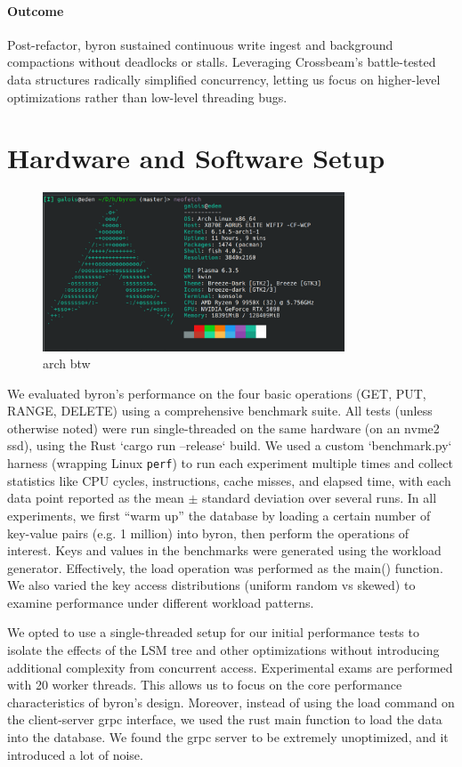 \documentclass[10pt]{article}
\begin{document}
\paragraph{Outcome}  
Post-refactor, byron sustained continuous write ingest and background compactions without deadlocks or stalls. Leveraging Crossbeam’s battle-tested data structures radically simplified concurrency, letting us focus on higher-level optimizations rather than low-level threading bugs.  


\section{Hardware and Software Setup}
\begin{figure}[htbp]
  \centering
  \includegraphics[width=0.8\textwidth]{neofetch.png}
  \caption{arch btw}
  \label{fig:neofetch}
\end{figure}

We evaluated byron’s performance on the four basic operations (GET, PUT, RANGE, DELETE) using a comprehensive benchmark suite. All tests (unless otherwise noted) were run single-threaded on the same hardware (on an nvme2 ssd), using the Rust `cargo run --release` build. We used a custom `benchmark.py` harness (wrapping Linux \texttt{perf}) to run each experiment multiple times and collect statistics like CPU cycles, instructions, cache misses, and elapsed time, with each data point reported as the mean $\pm$ standard deviation over several runs. In all experiments, we first “warm up” the database by loading a certain number of key-value pairs (e.g. 1 million) into byron, then perform the operations of interest. Keys and values in the benchmarks were generated using the workload generator. Effectively, the load operation was performed as the main() function. We also varied the key access distributions (uniform random vs skewed) to examine performance under different workload patterns.

We opted to use a single-threaded setup for our initial performance tests to isolate the effects of the LSM tree and other optimizations without introducing additional complexity from concurrent access. Experimental exams are performed with 20 worker threads. This allows us to focus on the core performance characteristics of byron’s design.
Moreover, instead of using the load command on the client-server grpc interface, we used the rust main function to load the data into the database. We found the grpc server to be extremely unoptimized, and it introduced a lot of noise.
\end{document}
